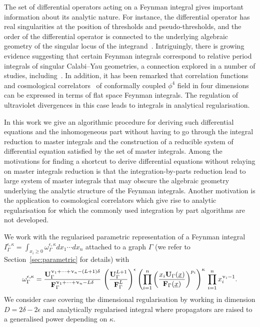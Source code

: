 \documentclass[a4paper,12pt]{article}
\numberwithin{equation}{section}
\numberwithin{figure}{section}
\begin{document}
\medskip
The set of differential operators acting on a Feynman integral gives
important information about its analytic nature. For instance, 
the differential  operator has real singularities at the position of
thresholds and pseudo-thresholds, and the order of the differential
operator is connected to the underlying algebraic geometry of the singular locus
of the integrand~\cite{Doran:2023yzu}. Intriguingly, there is  growing evidence suggesting that certain
Feynman integrals correspond to relative period integrals of singular
Calabi--Yau geometries, a connection explored in a number
of studies,
including~\cite{Brown:2009ta,Bloch:2014qca,Bloch:2016izu,Bourjaily:2018ycu,Bourjaily:2019hmc,Bourjaily:2018yfy,Klemm:2019dbm,Bonisch:2020qmm,Bonisch:2021yfw,Bourjaily:2022bwx,Forum:2022lpz,Duhr:2022pch,Frellesvig:2023PM,Pogel:2023zyd,Klemm:2024wtd}.
In addition, it has been remarked that correlation
functions~\cite{Heckelbacher:2022hbq}
and cosmological correlators~\cite{Heckelbacher:2022fbx,Chowdhury:2023arc}
of conformally
coupled $\phi^4$ field in four dimensions can be expressed in terms of
flat space Feynman integrals. The regulation of ultraviolet
divergences in this case leads to integrals in analytical regularisation.

In this work we give an algorithmic procedure for deriving such
differential equations and the inhomogeneous part without having to go through the integral
reduction to master integrals and the construction of a reducible
system of differential equation satisfied by the set of master
integrals. Among the motivations for finding a shortcut  to derive differential equations without relaying on   master
integrals reduction is that the integration-by-parts reduction lead to large
system of master integrals that may obscure the algebraic
geometry underlying the analytic
structure of the Feynman integrals.
Another motivation is the application to
cosmological correlators which give rise to analytic regularisation
for which the commonly used integration by part algorithms are not developed. 


We work with the regularised parametric representation of a Feynman integral $
I_\Gamma^{\epsilon,\kappa}=\int_{x_i\geq0}  \omega_\Gamma^{\epsilon,\kappa} dx_1\cdots dx_n$ attached to a
graph $\Gamma$ (we refer to 
Section~\ref{sec:parametric} for details)
with
\begin{equation}\label{e:OmegaAnRegIntro}
  \omega^{\epsilon,\kappa}_\Gamma = { \textbf{U}_\Gamma ^{\upnu_1+\cdots+\upnu_n-(L+1)\delta}  \over \textbf{F}_\Gamma ^{\upnu_1+\cdots+\upnu_n-L\delta} }\, \left(\textbf{U}_\Gamma^{L+1}\over \textbf{F}_\Gamma^{L}\right)^{\epsilon} 
  \left(\prod_{i=1}^n \left(x_i \textbf{U}_\Gamma(\underline x)\over
      \textbf{F}_\Gamma(\underline x)\right)^{p_i}\right)^{\kappa} \, \prod_{i=1}^n x_i^{\upnu_i-1} .
\end{equation}
We consider case covering
the dimensional regularisation by working in dimension
$D=2\delta-2\epsilon$ and analytically regularised integral where
propagators are raised to a generalised power depending on $\kappa$.
\end{document}
